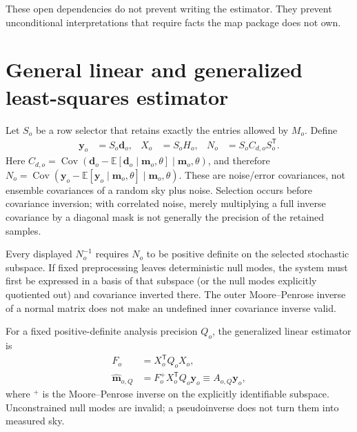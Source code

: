 \documentclass[11pt]{article}
\newcommand{\E}{\mathbb{E}}
\newcommand{\Cov}{\operatorname{Cov}}
\newcommand{\trans}{\mathsf{T}}
\begin{document}
These open dependencies do not prevent writing the estimator. They prevent
unconditional interpretations that require facts the map package does not own.

\section{General linear and generalized least-squares estimator}

Let \(S_o\) be a row selector that retains exactly the entries allowed by
\(M_o\). Define
\begin{align}
  \boldsymbol y_o &= S_o\boldsymbol d_o,
  &X_o &= S_oH_o,
  &N_o &= S_o C_{d,o}S_o^\trans .
  \label{eq:selected-system}
\end{align}
Here
\(C_{d,o}=\Cov(\boldsymbol d_o-\E[\boldsymbol d_o\mid
\boldsymbol m_o,\theta]\mid\boldsymbol m_o,\theta)\), and therefore
\(N_o=\Cov(\boldsymbol y_o-\E[\boldsymbol y_o\mid
\boldsymbol m_o,\theta]\mid\boldsymbol m_o,\theta)\). These are noise/error
covariances, not ensemble covariances of a random sky plus noise.
Selection occurs before covariance inversion; with correlated noise, merely
multiplying a full inverse covariance by a diagonal mask is not generally the
precision of the retained samples.

Every displayed \(N_o^{-1}\) requires \(N_o\) to be positive definite on the
selected stochastic subspace. If fixed preprocessing leaves deterministic
null modes, the system must first be expressed in a basis of that subspace (or
the null modes explicitly quotiented out) and covariance inverted there. The
outer Moore--Penrose inverse of a normal matrix does not make an undefined
inner covariance inverse valid.

For a fixed positive-definite analysis precision \(Q_o\), the generalized
linear estimator is
\begin{align}
  F_o &= X_o^\trans Q_o X_o,
  \label{eq:normal-matrix}\\
  \widehat{\boldsymbol m}_{o,Q}
    &= F_o^{+}X_o^\trans Q_o\boldsymbol y_o
     \equiv A_{o,Q}\boldsymbol y_o,
  \label{eq:general-linear-estimator}
\end{align}
where \({}^{+}\) is the Moore--Penrose inverse on the explicitly identifiable
subspace. Unconstrained null modes are invalid; a pseudoinverse does not turn
them into measured sky.
\end{document}

